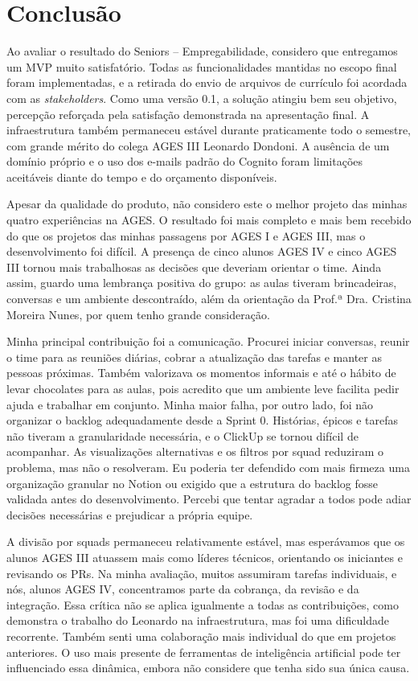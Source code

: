 \section[Conclusão]{Conclusão}

Ao avaliar o resultado do Seniors -- Empregabilidade, considero que entregamos um
MVP muito satisfatório. Todas as funcionalidades mantidas no escopo final foram
implementadas, e a retirada do envio de arquivos de currículo foi acordada com as
\textit{stakeholders}. Como uma versão 0.1, a solução atingiu bem seu objetivo,
percepção reforçada pela satisfação demonstrada na apresentação final. A
infraestrutura também permaneceu estável durante praticamente todo o semestre, com
grande mérito do colega AGES III Leonardo Dondoni. A ausência de um domínio próprio
e o uso dos e-mails padrão do Cognito foram limitações aceitáveis diante do tempo e
do orçamento disponíveis.

Apesar da qualidade do produto, não considero este o melhor projeto das minhas
quatro experiências na AGES. O resultado foi mais completo e mais bem recebido do
que os projetos das minhas passagens por AGES I e AGES III, mas o desenvolvimento
foi difícil. A presença de cinco alunos AGES IV e cinco AGES III tornou mais
trabalhosas as decisões que deveriam orientar o time. Ainda assim, guardo uma
lembrança positiva do grupo: as aulas tiveram brincadeiras, conversas e um ambiente
descontraído, além da orientação da Prof.ª Dra. Cristina Moreira Nunes, por quem
tenho grande consideração.

Minha principal contribuição foi a comunicação. Procurei iniciar conversas, reunir
o time para as reuniões diárias, cobrar a atualização das tarefas e manter as
pessoas próximas. Também valorizava os momentos informais e até o hábito de levar
chocolates para as aulas, pois acredito que um ambiente leve facilita pedir ajuda e
trabalhar em conjunto. Minha maior falha, por outro lado, foi não organizar o backlog
adequadamente desde a Sprint 0. Histórias, épicos e tarefas não tiveram a
granularidade necessária, e o ClickUp se tornou difícil de acompanhar. As
visualizações alternativas e os filtros por squad reduziram o problema, mas não o
resolveram. Eu poderia ter defendido com mais firmeza uma organização granular no
Notion ou exigido que a estrutura do backlog fosse validada antes do
desenvolvimento. Percebi que tentar agradar a todos pode adiar decisões necessárias
e prejudicar a própria equipe.

A divisão por squads permaneceu relativamente estável, mas esperávamos que os
alunos AGES III atuassem mais como líderes técnicos, orientando os iniciantes e
revisando os PRs. Na minha avaliação, muitos assumiram tarefas individuais, e nós,
alunos AGES IV, concentramos parte da cobrança, da revisão e da integração. Essa
crítica não se aplica igualmente a todas as contribuições, como demonstra o trabalho
do Leonardo na infraestrutura, mas foi uma dificuldade recorrente. Também senti uma
colaboração mais individual do que em projetos anteriores. O uso mais presente de
ferramentas de inteligência artificial pode ter influenciado essa dinâmica, embora
não considere que tenha sido sua única causa.


